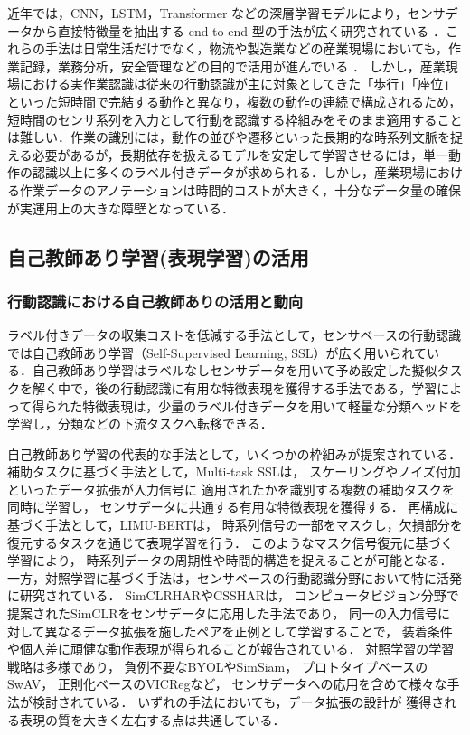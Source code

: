 \documentclass[submit]{ipsj}
\newcommand{\rev}[1]{{\color{red}#1}}
\begin{document}
{近年では，CNN，LSTM，Transformer などの深層学習モデルにより，センサデータから直接特徴量を抽出する end-to-end 型の手法が広く研究されている \cite{ordonez2016deep, dirgova2022wearable}．これらの手法は日常生活だけでなく，物流や製造業などの産業現場においても，作業記録，業務分析，安全管理などの目的で活用が進んでいる \cite{niemann2021context}．
しかし，産業現場における実作業認識は従来の行動認識が主に対象としてきた「歩行」「座位」といった短時間で完結する動作と異なり，複数の動作の連続で構成されるため，短時間のセンサ系列を入力として行動を認識する枠組みをそのまま適用することは難しい．作業の識別には，動作の並びや遷移といった長期的な時系列文脈を捉える必要があるが，長期依存を扱えるモデルを安定して学習させるには，単一動作の認識以上に多くのラベル付きデータが求められる．しかし，産業現場における作業データのアノテーションは時間的コストが大きく\cite{yoshimura2024openpack}，十分なデータ量の確保が実運用上の大きな障壁となっている．



\subsection{自己教師あり学習(表現学習)の活用}
\subsubsection{行動認識における自己教師ありの活用と動向}
ラベル付きデータの収集コストを低減する手法として，センサベースの行動認識では自己教師あり学習（Self-Supervised Learning, SSL）が広く用いられている\cite{logacjov2024self}．自己教師あり学習はラベルなしセンサデータを用いて予め設定した擬似タスクを解く中で，後の行動認識に有用な特徴表現を獲得する手法である，学習によって得られた特徴表現は，少量のラベル付きデータを用いて軽量な分類ヘッドを学習し，分類などの下流タスクへ転移できる．

自己教師あり学習の代表的な手法として，\rev{いくつかの枠組みが提案されている．}
\rev{補助タスクに基づく手法として，}Multi-task SSL\cite{saeed2019multi}は，
スケーリングやノイズ付加といったデータ拡張が入力信号に
適用されたかを識別する複数の補助タスクを同時に学習し，
センサデータに共通する有用な特徴表現を獲得する．
\rev{再構成に基づく手法として，}LIMU-BERT\cite{xu2021limu}は，
時系列信号の一部をマスクし，欠損部分を復元するタスクを通じて表現学習を行う．
このようなマスク信号復元に基づく学習により，
時系列データの周期性や時間的構造を捉えることが可能となる．
\rev{一方，対照学習に基づく手法は，センサベースの行動認識分野において特に活発に研究されている．
SimCLRHAR\cite{tang2020exploring}やCSSHAR\cite{khaertdinov2021contrastive}は，
コンピュータビジョン分野で提案されたSimCLR\cite{chen2020simple}をセンサデータに応用した手法であり，
同一の入力信号に対して異なるデータ拡張を施したペアを正例として学習することで，
装着条件や個人差に頑健な動作表現が得られることが報告されている．
対照学習の学習戦略は多様であり，
負例不要なBYOL\cite{grill2020bootstrap}やSimSiam\cite{chen2021exploring}，
プロトタイプベースのSwAV\cite{caron2020unsupervised}，
正則化ベースのVICReg\cite{bardes2021vicreg}など，
センサデータへの応用を含めて様々な手法が検討されている\cite{logacjov2024self}．
いずれの手法においても，データ拡張の設計が
獲得される表現の質を大きく左右する点は共通している．}

}
\end{document}
